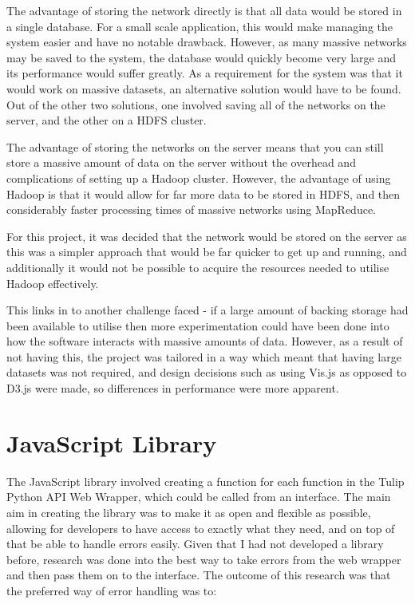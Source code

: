 \documentclass[../dissertation.tex]{subfiles}
\begin{document}
The advantage of storing the network directly is that all data would be stored in a single database. For a small scale application, this would make managing the system easier and have no notable drawback. However, as many massive networks may be saved to the system, the database would quickly become very large and its performance would suffer greatly. As a requirement for the system was that it would work on massive datasets, an alternative solution would have to be found. Out of the other two solutions, one involved saving all of the networks on the server, and the other on a HDFS cluster. 

The advantage of storing the networks on the server means that you can still store a massive amount of data on the server without the overhead and complications of setting up a Hadoop cluster. However, the advantage of using Hadoop is that it would allow for far more data to be stored in HDFS, and then considerably faster processing times of massive networks using MapReduce.

For this project, it was decided that the network would be stored on the server as this was a simpler approach that would be far quicker to get up and running, and additionally it would not be possible to acquire the resources needed to utilise Hadoop effectively.

This links in to another challenge faced - if a large amount of backing storage had been available to utilise then more experimentation could have been done into how the software interacts with massive amounts of data. However, as a result of not having this, the project was tailored in a way which meant that having large datasets was not required, and design decisions such as using Vis.js as opposed to D3.js were made, so differences in performance were more apparent.

\section{JavaScript Library}
\label{sec:jslib}

The JavaScript library involved creating a function for each function in the Tulip Python API Web Wrapper, which could be called from an interface. The main aim in creating the library was to make it as open and flexible as possible, allowing for developers to have access to exactly what they need, and on top of that be able to handle errors easily. Given that I had not developed a library before, research was done into the best way to take errors from the web wrapper and then pass them on to the interface. The outcome of this research was that the preferred way of error handling was to:
\end{document}
